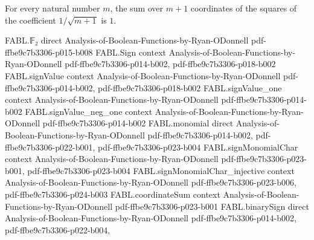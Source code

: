 \begin{theorem}
\label{FABL.sum_normalizedRademacherCoefficient_sq}
\leanok
{}
For every natural number $m$, the sum over $m+1$ coordinates of the squares of the
coefficient $1/\sqrt{m+1}$ is $1$.
\end{theorem}

\begin{theorem}
\label{FABL.fourierCoeff_hammingUpperTailIndicator_singleton}
\leanok
{}
\proofstep
  {FABL.𝔽₂}
  {direct}
  {Analysis-of-Boolean-Functions-by-Ryan-ODonnell}
  {pdf-ffbe9c7b3306-p015-b008}
\proofstep
  {FABL.Sign}
  {context}
  {Analysis-of-Boolean-Functions-by-Ryan-ODonnell}
  {pdf-ffbe9c7b3306-p014-b002,
    pdf-ffbe9c7b3306-p018-b002}
\proofstep
  {FABL.signValue}
  {context}
  {Analysis-of-Boolean-Functions-by-Ryan-ODonnell}
  {pdf-ffbe9c7b3306-p014-b002,
    pdf-ffbe9c7b3306-p018-b002}
\proofstep
  {FABL.signValue_one}
  {context}
  {Analysis-of-Boolean-Functions-by-Ryan-ODonnell}
  {pdf-ffbe9c7b3306-p014-b002}
\proofstep
  {FABL.signValue_neg_one}
  {context}
  {Analysis-of-Boolean-Functions-by-Ryan-ODonnell}
  {pdf-ffbe9c7b3306-p014-b002}
\proofstep
  {FABL.monomial}
  {direct}
  {Analysis-of-Boolean-Functions-by-Ryan-ODonnell}
  {pdf-ffbe9c7b3306-p014-b002,
    pdf-ffbe9c7b3306-p022-b001,
    pdf-ffbe9c7b3306-p023-b004}
\proofstep
  {FABL.signMonomialChar}
  {context}
  {Analysis-of-Boolean-Functions-by-Ryan-ODonnell}
  {pdf-ffbe9c7b3306-p023-b001,
    pdf-ffbe9c7b3306-p023-b004}
\proofstep
  {FABL.signMonomialChar_injective}
  {context}
  {Analysis-of-Boolean-Functions-by-Ryan-ODonnell}
  {pdf-ffbe9c7b3306-p023-b006,
    pdf-ffbe9c7b3306-p024-b003}
\proofstep
  {FABL.coordinateSum}
  {context}
  {Analysis-of-Boolean-Functions-by-Ryan-ODonnell}
  {pdf-ffbe9c7b3306-p023-b001}
\proofstep
  {FABL.binarySign}
  {direct}
  {Analysis-of-Boolean-Functions-by-Ryan-ODonnell}
  {pdf-ffbe9c7b3306-p014-b002,
    pdf-ffbe9c7b3306-p022-b004,
}
\end{theorem}

